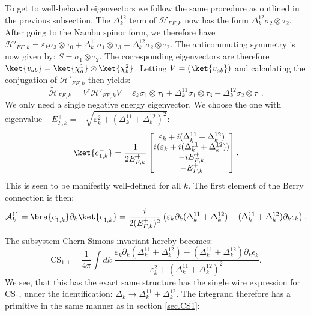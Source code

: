 To get to well-behaved eigenvectors we follow the same procedure as outlined in the previous subsection. The $\Delta^{12}_k$ term of $\mathcal{H}_{FF,k}$ now has the form $\Delta^{12}_k \sigma_2 \otimes \tau_2$. After going to the Nambu spinor form, we therefore have $\mathcal{H}'_{FF,k} = \varepsilon_k \sigma_3 \otimes \tau_0 + \Delta^{11}_k \sigma_1 \otimes \tau_3 + \Delta^{12}_k \sigma_2 \otimes \tau_2$. The anticommuting symmetry is now given by: $S = \sigma_1\otimes \tau_2$. The corresponding eigenvectors are therefore $\ket{v_{ab}} = \ket{\chi^{1}_a}\otimes\ket{\chi^{2}_b}$. Letting $V = (\ket{v_{ab}})$ and calculating the conjugation of $\mathcal{H}'_{FF,k}$ then yields:
\begin{equation}
\tilde{\mathcal{H}}_{FF,k} = V^\dagger\mathcal{H}'_{FF,k}V = \varepsilon_k \sigma_1\otimes \tau_1 + \Delta^{11}_k \sigma_1\otimes\tau_3 - \Delta^{12}_k\sigma_2\otimes\tau_1. \nonumber 
\end{equation}
We only need a single negative energy eigenvector. We choose the one with eigenvalue $-E^+_{F,k} = -\sqrt{\varepsilon_k^2 + (\Delta^{11}_k + \Delta^{12}_k)^2}$: 
\begin{equation}
\ket{e^{-}_{1,k}} = \frac{1}{2E^{+}_{F,k}}\begin{bmatrix} \varepsilon_k + i(\Delta^{11}_k + \Delta^{12}_k) \\ i(\varepsilon_k + i(\Delta^{11}_k + \Delta^{12}_k)) \\ -iE^{+}_{F,k} \\ -E^{+}_{F,k} \end{bmatrix}. \nonumber
\end{equation}
This is seen to be manifestly well-defined for all $k$. The first element of the Berry connection is then:
\begin{equation}
\mathcal{A}^{11}_k = \bra{e^{-}_{1,k}}\partial_k\ket{e^{-}_{1,k}} = \frac{i}{2(E^{+}_{F,k})^2}\left(\varepsilon_k\partial_k(\Delta^{11}_k + \Delta^{12}_k) - (\Delta^{11}_k + \Delta^{12}_k)\partial_k \epsilon_k\right). \nonumber
\end{equation}
The subsystem Chern-Simons invariant hereby becomes: 
\begin{equation}
\text{CS}_{1,1} = \frac{1}{4\pi}\int dk \; \frac{\varepsilon_k\partial_k(\Delta^{11}_k + \Delta^{12}_k) - (\Delta^{11}_k + \Delta^{12}_k)\partial_k \epsilon_k}{\varepsilon_k^2 + (\Delta^{11}_k + \Delta^{12}_k)^2}. 
\label{eq.CS11integralform}
\end{equation}
We see, that this has the exact same structure has the single wire expression for $\text{CS}_{1}$, under the identification: $\Delta_k \to \Delta^{11}_k + \Delta^{12}_k$. The integrand therefore has a primitive in the same manner as in section \ref{sec.CS1}:
